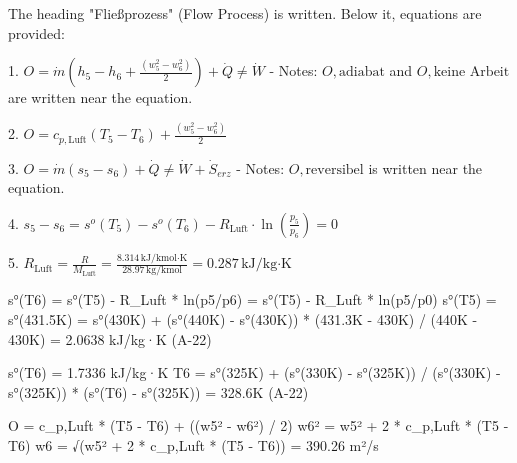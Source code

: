 The heading "Fließprozess" (Flow Process) is written. Below it, equations are provided:  

1. \( O = \dot{m} (h_5 - h_6 + \frac{(w_5^2 - w_6^2)}{2}) + \dot{Q} \neq \dot{W} \)  
   - Notes: \( O, \text{adiabat} \) and \( O, \text{keine Arbeit} \) are written near the equation.  

2. \( O = c_{p,\text{Luft}} (T_5 - T_6) + \frac{(w_5^2 - w_6^2)}{2} \)  

3. \( O = \dot{m} (s_5 - s_6) + \dot{Q} \neq \dot{W} + \dot{S}_{erz} \)  
   - Notes: \( O, \text{reversibel} \) is written near the equation.  

4. \( s_5 - s_6 = s^o(T_5) - s^o(T_6) - R_{\text{Luft}} \cdot \ln(\frac{p_5}{p_6}) = 0 \)  

5. \( R_{\text{Luft}} = \frac{R}{M_{\text{Luft}}} = \frac{8.314 \, \text{kJ/kmol·K}}{28.97 \, \text{kg/kmol}} = 0.287 \, \text{kJ/kg·K} \)

s°(T6) = s°(T5) - R_Luft * ln(p5/p6) = s°(T5) - R_Luft * ln(p5/p0)  
s°(T5) = s°(431.5K) = s°(430K) + (s°(440K) - s°(430K)) * (431.3K - 430K) / (440K - 430K)  
= 2.0638 kJ/kg·K (A-22)  

s°(T6) = 1.7336 kJ/kg·K  
T6 = s°(325K) + (s°(330K) - s°(325K)) / (s°(330K) - s°(325K)) * (s°(T6) - s°(325K))  
= 328.6K (A-22)  

O = c_p,Luft * (T5 - T6) + ((w5² - w6²) / 2)  
w6² = w5² + 2 * c_p,Luft * (T5 - T6)  
w6 = √(w5² + 2 * c_p,Luft * (T5 - T6)) = 390.26 m²/s